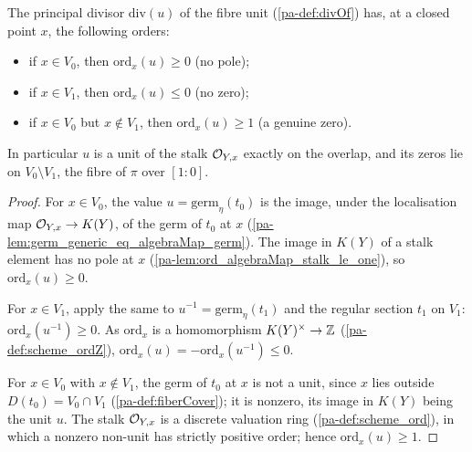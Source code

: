 \begin{theorem}
  \label{pa-thm:fiberCoordUnit_order}
  \leanok

  The principal divisor \(\mathrm{div}(u)\) of the fibre unit (\ref{pa-def:divOf}) has, at a closed
  point \(x\), the following orders:
  \begin{itemize}
    \item if \(x \in V_0\), then \(\mathrm{ord}_x(u) \ge 0\) (no pole);
    \item if \(x \in V_1\), then \(\mathrm{ord}_x(u) \le 0\) (no zero);
    \item if \(x \in V_0\) but \(x \notin V_1\), then \(\mathrm{ord}_x(u) \ge 1\) (a genuine zero).
  \end{itemize}
  In particular \(u\) is a unit of the stalk \(\mathcal{O}_{Y,x}\) exactly on the overlap, and its zeros
  lie on \(V_0 \setminus V_1\), the fibre of \(\pi\) over \([1 : 0]\).
\end{theorem}
\begin{proof}
  \leanok
  For \(x \in V_0\), the value \(u = \mathrm{germ}_{\eta}(t_0)\) is the image, under the localisation
  map \(\mathcal{O}_{Y,x} \to K(Y)\), of the germ of \(t_0\) at \(x\)
  (\ref{pa-lem:germ_generic_eq_algebraMap_germ}). The image in \(K(Y)\) of a stalk element has no pole
  at \(x\) (\ref{pa-lem:ord_algebraMap_stalk_le_one}), so \(\mathrm{ord}_x(u) \ge 0\).

  For \(x \in V_1\), apply the same to \(u^{-1} = \mathrm{germ}_{\eta}(t_1)\) and the regular section
  \(t_1\) on \(V_1\): \(\mathrm{ord}_x(u^{-1}) \ge 0\). As \(\mathrm{ord}_x\) is a homomorphism
  \(K(Y)^{\times} \to \mathbb{Z}\) (\ref{pa-def:scheme_ordZ}), \(\mathrm{ord}_x(u) = -\mathrm{ord}_x(u^{-1}) \le
  0\).

  For \(x \in V_0\) with \(x \notin V_1\), the germ of \(t_0\) at \(x\) is not a unit, since \(x\)
  lies outside \(D(t_0) = V_0 \cap V_1\) (\ref{pa-def:fiberCover}); it is nonzero, its image in \(K(Y)\)
  being the unit \(u\). The stalk \(\mathcal{O}_{Y,x}\) is a discrete valuation ring (\ref{pa-def:scheme_ord}),
  in which a nonzero non-unit has strictly positive order; hence \(\mathrm{ord}_x(u) \ge 1\).
\end{proof}


